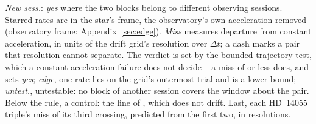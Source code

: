 \begin{table}
\centering
\caption{\textbf{Can two crossings be one carrier?} The \TjNPair{} pairs
toward one star with an unattributed member (\S\ref{sec:etacrv}); the note
below defines the columns and the verdicts.}
\label{tab:pairs}
\scriptsize

\par\vspace{2pt}

\par\vspace{2pt}
{\scriptsize \emph{New sess.}: \emph{yes} where the two blocks belong to different
observing sessions. Starred rates are in the star's frame, the observatory's
own acceleration removed (observatory frame: Appendix~\ref{sec:edge}). \emph{Miss} measures
departure from constant acceleration, in units of the drift grid's resolution
over $\Delta t$; a dash marks a pair that resolution cannot separate. The
verdict is set by the bounded-trajectory test, which a constant-acceleration
failure does not decide -- a miss of \TjAcceptSig{} or less does, and sets
\emph{yes}; \emph{edge}, one rate lies on the grid's outermost trial and is
a lower bound; \emph{untest.}, untestable: no block of another session
covers the window about the pair. Below the rule, a control: the \TjCtlLine{} line of
\TjCtlStar, which does not drift. Last, each HD~14055 triple's miss of its
third crossing, predicted from the first two, in resolutions.\par}
\end{table}

\begin{table}
\centering
\caption{\textbf{The two events}, the crossings whose
stellar statistic exceeds all \NCtrl{} control positions of their own window.
\S\ref{sec:vistest} reads them.}
\label{tab:cand}
\footnotesize

\end{table}

